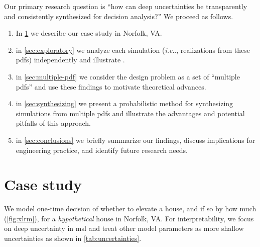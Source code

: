 \documentclass[11pt]{article}
\makeatletter
\DeclareRobustCommand\onedot{\futurelet\@let@token\@onedot}
\def\@onedot{\ifx\@let@token.\else.\null\fi\xspace}
\def\ie{\emph{i.e}\onedot} \def\Ie{\emph{I.e}\onedot}
\DeclareRobustCommand\onedot{\futurelet\@let@token\@onedot}
\def\@onedot{\ifx\@let@token.\else.\null\fi\xspace}
\def\ie{\emph{i.e}\onedot} \def\Ie{\emph{I.e}\onedot}
\makeatother
\begin{document}
Our primary research question is ``how can deep uncertainties be transparently and consistently synthesized for decision analysis?''
We proceed as follows.
\begin{enumerate}
    \item In \cref{sec:case-study} we describe our case study in Norfolk, VA.
    \item  in \cref{sec:exploratory} we analyze each simulation (\ie, realizations from these \glspl{pdf}) independently and illustrate .
    \item  in \cref{sec:multiple-pdf} we consider the design problem as a set of ``multiple \glspl{pdf}'' and use these findings to motivate theoretical advances.
    \item  in \cref{sec:synthesizing} we present a probabilistic method for synthesizing simulations from multiple \glspl{pdf} and illustrate the advantages and potential pitfalls of this approach.
    \item  in \cref{sec:conclusions} we briefly summarize our findings, discuss implications for engineering practice, and identify  future research needs.
\end{enumerate}


\section{Case study}\label{sec:case-study}

We model one-time decision of whether to elevate a house, and if so by how much (\cref{fig:xlrm}), for a \emph{hypothetical} house in Norfolk, VA.
For interpretability, we focus on deep uncertainty in \gls{msl} and treat other model parameters as more shallow uncertainties as shown in \cref{tab:uncertainties}.
\end{document}
